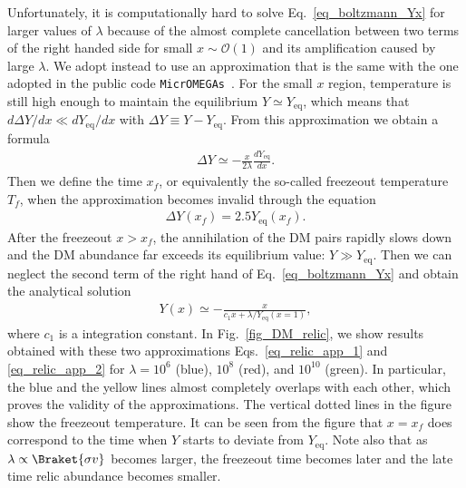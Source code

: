 \documentclass[12pt,twoside,book]{article}
\begin{document}
Unfortunately, it is computationally hard to solve
Eq.~\eqref{eq_boltzmann_Yx} for larger values of $\lambda$ because of
the almost complete cancellation between two terms of the right handed
side for small $x\sim \mathcal{O}(1)$ and its amplification caused by
large $\lambda$.  We adopt instead to use an approximation that is the
same with the one adopted in the public code
\texttt{MicrOMEGAs}~\cite{Belanger:2001fz, Belanger:2018mqt}.  For the
small $x$ region, temperature is still high enough to maintain the
equilibrium $Y \simeq Y_{\mathrm{eq}}$, which means that $d \Delta Y / d
x \ll d Y_{\mathrm{eq}} / d x$ with $\Delta Y \equiv Y -
Y_{\mathrm{eq}}$.  From this approximation we obtain a formula
\begin{align}
 \Delta Y \simeq -\frac{x}{2 \lambda} \frac{d Y_{\mathrm{eq}}}{d x}.\label{eq_relic_app_1}
\end{align}
Then we define the time $x_f$, or equivalently the so-called freezeout
temperature $T_f$, when the approximation becomes invalid through the
equation
\begin{align}
 \Delta Y (x_f) = 2.5 Y_{\mathrm{eq}} (x_f).
\end{align}
After the freezeout $x > x_f$, the annihilation of the DM pairs
rapidly slows down and the DM abundance far exceeds its equilibrium
value: $Y \gg Y_{\mathrm{eq}}$.  Then we can neglect the second term
of the right hand of Eq.~\eqref{eq_boltzmann_Yx} and obtain the
analytical solution
\begin{align}
 Y(x) \simeq - \frac{x}{c_1 x + \lambda / Y_{\mathrm{eq}} (x=1)},\label{eq_relic_app_2}
\end{align}
where $c_1$ is a integration constant.  In Fig.~\ref{fig_DM_relic}, we
show results obtained with these two approximations
Eqs.~\eqref{eq_relic_app_1} and \eqref{eq_relic_app_2} for $\lambda =
10^6$ (blue), $10^8$ (red), and $10^{10}$ (green).  In particular,
the blue and the yellow lines almost completely overlaps with each
other, which proves the validity of the approximations.  The vertical
dotted lines in the figure show the freezeout temperature.  It can be
seen from the figure that $x = x_f$ does correspond to the time when $Y$
starts to deviate from $Y_{\mathrm{eq}}$.  Note also that as $\lambda
\propto \Braket{\sigma v}$ becomes larger, the freezeout time becomes
later and the late time relic abundance becomes smaller.
\end{document}
